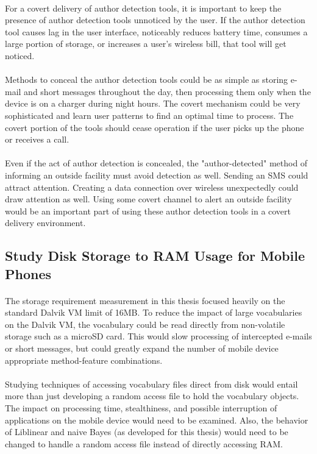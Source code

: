 	\paragraph*{} For a covert delivery of author detection tools, it is important to keep the presence of author detection tools unnoticed by the user.  If the author detection tool causes lag in the user interface, noticeably reduces battery time, consumes a large portion of storage, or increases a user's wireless bill, that tool will get noticed.
	\paragraph*{} Methods to conceal the author detection tools could be as simple as storing e-mail and short messages throughout the day, then processing them only when the device is on a charger during night hours.  The covert mechanism could be very sophisticated and learn user patterns to find an optimal time to process.  The covert portion of the tools should cease operation if the user picks up the phone or receives a call.
	\paragraph*{} Even if the act of author detection is concealed, the "author-detected" method of informing an outside facility must avoid detection as well.  Sending an SMS could attract attention.  Creating a data connection over wireless unexpectedly could draw attention as well.  Using some covert channel to alert an outside facility would be an important part of using these author detection tools in a covert delivery environment.

	\subsection{Study Disk Storage to RAM Usage for Mobile Phones}
	\paragraph*{} The storage requirement measurement in this thesis focused heavily on the standard Dalvik VM limit of 16MB.  To reduce the impact of large vocabularies on the Dalvik VM, the vocabulary could be read directly from non-volatile storage such as a microSD card.  This would slow processing of intercepted e-mails or short messages, but could greatly expand the number of mobile device appropriate method-feature combinations.
	\paragraph*{} Studying techniques of accessing vocabulary files direct from disk would entail more than just developing a random access file to hold the vocabulary objects.  The impact on processing time, stealthiness, and possible interruption of applications on the mobile device would need to be examined.  Also, the behavior of Liblinear and naive Bayes (as developed for this thesis) would need to be changed to handle a random access file instead of directly accessing RAM.
